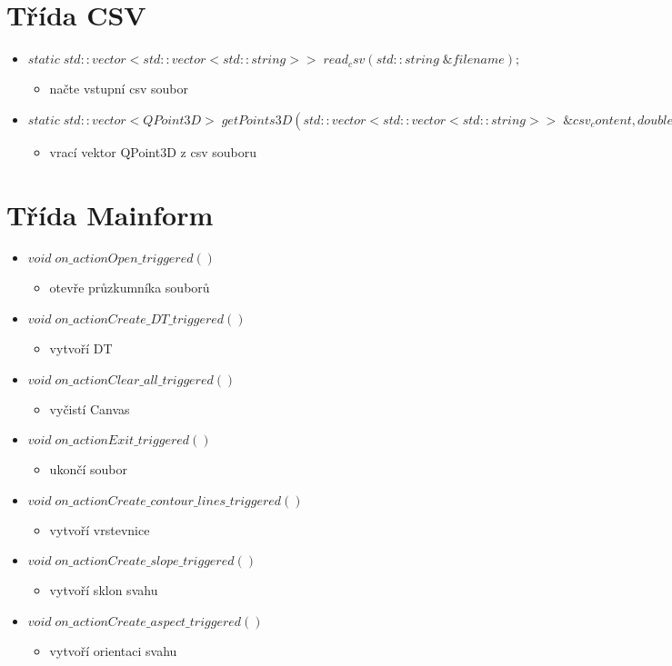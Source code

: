 \documentclass[oneside,12pt,a4paper]{book}
\begin{document}
   \section{Třída CSV}
    \begin{itemize}
    \item $static\; std::vector<std::vector<std::string>>\; read_csv(std::string\; \&filename);$
    \begin{itemize}
\item načte vstupní csv soubor
\end{itemize}
\item $static\; std::vector<QPoint3D>\; getPoints3D(std::vector<std::vector<std::string>>\; \&csv_content, double\; \&x_min,double\; \&x_max, double\; \&y_min, double\; \&y_max);$
\begin{itemize}
\item vrací vektor QPoint3D z csv souboru
\end{itemize}
\end{itemize}

   \section{Třída Mainform}
    \begin{itemize}
    \item $void \;on\_actionOpen\_triggered()$
    \begin{itemize}
\item otevře průzkumníka souborů
\end{itemize}
    \item $void \;on\_actionCreate\_DT\_triggered()$
    \begin{itemize}
\item vytvoří DT
\end{itemize}
    \item $void \;on\_actionClear\_all\_triggered()$
    \begin{itemize}
\item vyčistí Canvas
\end{itemize}
    \item $void \;on\_actionExit\_triggered()$
    \begin{itemize}
\item ukončí soubor
\end{itemize}
    \item $void \;on\_actionCreate\_contour\_lines\_triggered()$
    \begin{itemize}
\item vytvoří vrstevnice
\end{itemize}
    \item $void \;on\_actionCreate\_slope\_triggered()$
    \begin{itemize}
\item vytvoří sklon svahu
\end{itemize}
    \item $void \;on\_actionCreate\_aspect\_triggered()$
    \begin{itemize}
\item vytvoří orientaci svahu
\end{itemize}
\end{itemize}
\end{document}
